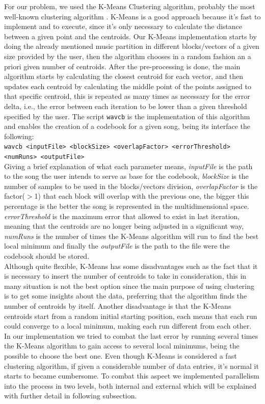 \documentclass[12pt]{article}
\begin{document}
For our problem, we used the K-Means Clustering algorithm, probably the most well-known clustering algorithm \cite{clustering}. K-Means is a good approach because it's fast to implement and to execute, since it's only necessary to calculate the distance between a given point and the centroids. 
Our K-Means implementation starts by doing the already mentioned music partition in different blocks/vectors of a given size provided by the user, then the algorithm chooses in a random fashion an a priori given number of centroids. After the pre-processing is done, the main algorithm starts by calculating the closest centroid for each vector, and then updates each centroid by calculating the middle point of the points assigned to that specific centroid, this is repeated as many times as necessary for the error delta, i.e., the error between each iteration to be lower than a given threshold specified by the user. The script \texttt{wavcb} is the implementation of this algorithm and enables the creation of a codebook for a given song, being its interface the following:\\
\texttt{wavcb <inputFile> <blockSize> <overlapFactor> <errorThreshold>\\<numRuns> <outputFile>}\\
Giving a brief explanation of what each parameter means, \textit{inputFile} is the path to the song the user intends to serve as base for the codebook, \textit{blockSize} is the number of samples to be used in the blocks/vectors division, \textit{overlapFactor} is the factor($>$1) that each block will overlap with the previous one, the bigger this percentage is the better the song is represented in the multidimensional space. \textit{errorThreshold} is the maximum error that allowed to exist in last iteration, meaning that the centroids are no longer being adjusted in a significant way, \textit{numRuns} is the number of times the K-Means algorithm will run to find the best local minimum and finally the \textit{outputFile} is the path to the file were the codebook should be stored.\\
Although quite flexible, K-Means has some disadvantages such as the fact that it is necessary to insert the number of centroids to take in consideration, this in many situation is not the best option since the main purpose of using clustering is to get some insights about the data, preferring that the algorithm finds the number of centroids by itself. Another disadvantage is that the K-Means centroids start from a random initial starting position, each means that each run could converge to a local minimum, making each run different from each other.\\
In our implementation we tried to combat the last error by running several times the K-Means algorithm to gain access to several local minimums, being the possible to choose the best one. Even though K-Means is considered a fast clustering algorithm, if given a considerable number of data entries, it's normal it starts to became cumbersome. To combat this aspect we implemented parallelism into the process in two levels, both internal and external which will be explained with further detail in following subsection.
\end{document}
